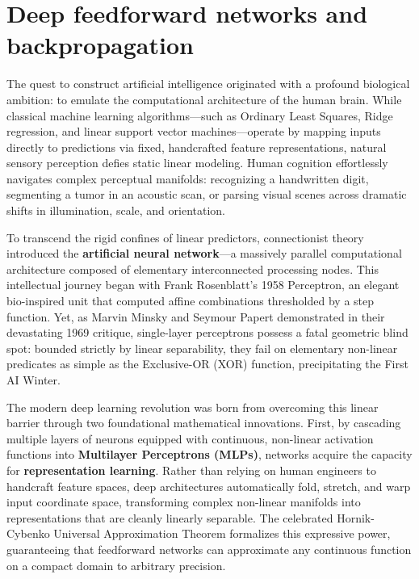 \chapter{Deep feedforward networks and backpropagation}
\label{sec:deep_feedforward_and_backpropagation}

The quest to construct artificial intelligence originated with a profound biological ambition: to emulate the computational architecture of the human brain. While classical machine learning algorithms—such as Ordinary Least Squares, Ridge regression, and linear support vector machines—operate by mapping inputs directly to predictions via fixed, handcrafted feature representations, natural sensory perception defies static linear modeling. Human cognition effortlessly navigates complex perceptual manifolds: recognizing a handwritten digit, segmenting a tumor in an acoustic scan, or parsing visual scenes across dramatic shifts in illumination, scale, and orientation.

To transcend the rigid confines of linear predictors, connectionist theory introduced the \textbf{artificial neural network}—a massively parallel computational architecture composed of elementary interconnected processing nodes. This intellectual journey began with Frank Rosenblatt's 1958 Perceptron, an elegant bio-inspired unit that computed affine combinations thresholded by a step function. Yet, as Marvin Minsky and Seymour Papert demonstrated in their devastating 1969 critique, single-layer perceptrons possess a fatal geometric blind spot: bounded strictly by linear separability, they fail on elementary non-linear predicates as simple as the Exclusive-OR (XOR) function, precipitating the First AI Winter.

The modern deep learning revolution was born from overcoming this linear barrier through two foundational mathematical innovations. First, by cascading multiple layers of neurons equipped with continuous, non-linear activation functions into \textbf{Multilayer Perceptrons (MLPs)}, networks acquire the capacity for \textbf{representation learning}. Rather than relying on human engineers to handcraft feature spaces, deep architectures automatically fold, stretch, and warp input coordinate space, transforming complex non-linear manifolds into representations that are cleanly linearly separable. The celebrated Hornik-Cybenko Universal Approximation Theorem formalizes this expressive power, guaranteeing that feedforward networks can approximate any continuous function on a compact domain to arbitrary precision.

